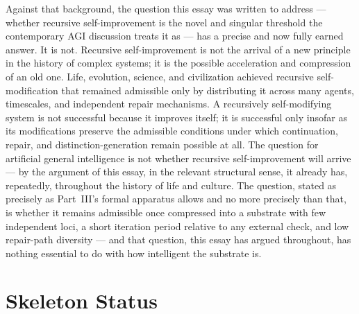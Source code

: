 \documentclass[12pt,a4paper]{article}
\theoremstyle{plain}
\theoremstyle{definition}
\theoremstyle{remark}
\begin{document}
Against that background, the question this essay was written to address — whether recursive self-improvement is the novel and singular threshold the contemporary AGI discussion treats it as — has a precise and now fully earned answer. It is not. Recursive self-improvement is not the arrival of a new principle in the history of complex systems; it is the possible acceleration and compression of an old one. Life, evolution, science, and civilization achieved recursive self-modification that remained admissible only by distributing it across many agents, timescales, and independent repair mechanisms. A recursively self-modifying system is not successful because it improves itself; it is successful only insofar as its modifications preserve the admissible conditions under which continuation, repair, and distinction-generation remain possible at all. The question for artificial general intelligence is not whether recursive self-improvement will arrive — by the argument of this essay, in the relevant structural sense, it already has, repeatedly, throughout the history of life and culture. The question, stated as precisely as Part~III's formal apparatus allows and no more precisely than that, is whether it remains admissible once compressed into a substrate with few independent loci, a short iteration period relative to any external check, and low repair-path diversity — and that question, this essay has argued throughout, has nothing essential to do with how intelligent the substrate is.

\section*{Skeleton Status}
\end{document}
